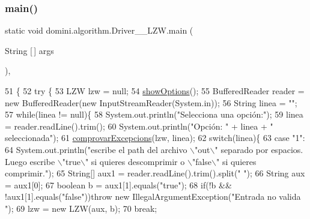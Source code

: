 \subsubsection{\texorpdfstring{main()}{main()}}
{\footnotesize\ttfamily static void domini.\+algorithm.\+Driver\+\_\+\+\_\+\+L\+Z\+W.\+main (\begin{DoxyParamCaption}\item[{String \mbox{[}$\,$\mbox{]}}]{args }\end{DoxyParamCaption})\hspace{0.3cm}{\ttfamily [inline]}, {\ttfamily [static]}}


\begin{DoxyCode}
51                                            \{
52     \textcolor{keywordflow}{try} \{
53         LZW lzw = null;
54         \hyperlink{classdomini_1_1algorithm_1_1Driver____LZW_ad43ebe1afd0d4e5be51584c71a1789d2}{showOptions}();
55         BufferedReader reader = \textcolor{keyword}{new} BufferedReader(\textcolor{keyword}{new} InputStreamReader(System.in));
56         String linea = \textcolor{stringliteral}{""};
57         \textcolor{keywordflow}{while}(linea != null)\{
58             System.out.println(\textcolor{stringliteral}{"Selecciona una opción:"});
59             linea = reader.readLine().trim();
60             System.out.println(\textcolor{stringliteral}{"Opción: "} + linea + \textcolor{stringliteral}{" seleccionada"});
61             \hyperlink{classdomini_1_1algorithm_1_1Driver____LZW_a3f609a2c3a22d0c7d11a5ff4e015e433}{comprovarExcepcions}(lzw, linea);
62             \textcolor{keywordflow}{switch}(linea)\{
63                 \textcolor{keywordflow}{case} \textcolor{stringliteral}{"1"}:
64                     System.out.println(\textcolor{stringliteral}{"escribe el path del archivo \(\backslash\)"out\(\backslash\)" separado por espacios. Luego
       escribe \(\backslash\)"true\(\backslash\)" si quieres descomprimir o \(\backslash\)"false\(\backslash\)" si quieres comprimir."});
65                     String[] aux1 = reader.readLine().trim().split(\textcolor{stringliteral}{" "});
66                     String aux = aux1[0];
67                     \textcolor{keywordtype}{boolean} b = aux1[1].equals(\textcolor{stringliteral}{"true"});
68                     \textcolor{keywordflow}{if}(!b && !aux1[1].equals(\textcolor{stringliteral}{"false"}))\textcolor{keywordflow}{throw} \textcolor{keyword}{new} IllegalArgumentException(\textcolor{stringliteral}{"Entrada no valida
      "});
69                     lzw = \textcolor{keyword}{new} LZW(aux, b);
70                 \textcolor{keywordflow}{break};

\end{DoxyCode}

